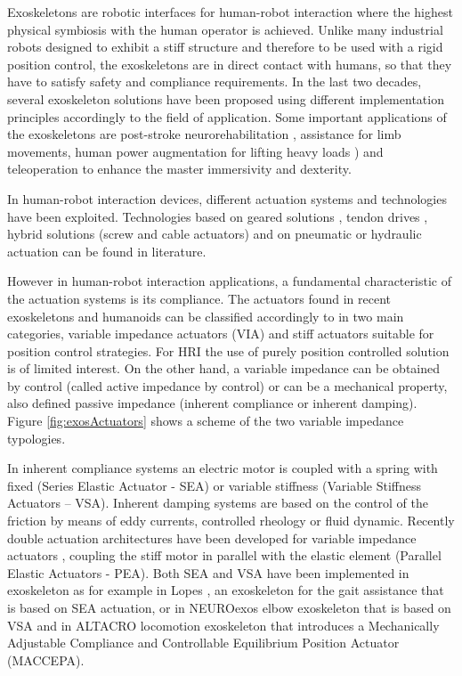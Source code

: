 \documentclass[journal]{IEEEtran}
\newcommand{\figref}[1]{Figure \ref{#1}}
\begin{document}
Exoskeletons are robotic interfaces for human-robot interaction where the highest physical symbiosis with the human operator is achieved.
Unlike many industrial robots  designed to exhibit a stiff structure and therefore to be used with a rigid position control, the exoskeletons are in direct contact with humans, so that  they have to satisfy  safety and compliance requirements.
In the last two decades, several exoskeleton solutions have been proposed using different implementation principles accordingly to the field of application.
Some important applications of the exoskeletons are post-stroke neurorehabilitation \cite{lo2012exoskeleton,pirondini2016evaluation}, assistance for limb movements, human power augmentation for lifting  heavy loads \cite{kim2016powered}) and teleoperation \cite{buongiorno2018wres, rebelo2014bilateral} to enhance the master immersivity and dexterity.
%
\par In human-robot interaction devices, different actuation systems and technologies have been exploited.
Technologies based on geared solutions \cite{mihelj2007armin,vertechy2009development,carignan2005design}, tendon drives \cite{frisoli2009force,perry2007upper}, hybrid solutions (screw and cable actuators) \cite{garrec2008able} and  on pneumatic or hydraulic  actuation \cite{tsagarakis2003development,klein2010optimization} can be found in literature.
\par However in human-robot interaction applications, a fundamental characteristic of the actuation systems is its compliance. The actuators found in recent exoskeletons and humanoids can be classified accordingly to \cite{vanderborght2013variable} in two main categories, variable impedance actuators (VIA) and stiff actuators suitable for position control strategies. For HRI the use of purely position controlled solution is of limited interest. On the other hand, a variable impedance can be obtained by control (called active impedance by control) or can be a mechanical property, also defined passive impedance (inherent compliance or inherent damping). \figref{fig:exosActuators} shows a scheme of the two variable impedance typologies.
%
\par In inherent compliance systems an electric motor is coupled with a spring with fixed (Series Elastic Actuator - SEA) or variable stiffness (Variable Stiffness Actuators – VSA). Inherent damping systems are based on the control of the friction by means of eddy currents, controlled rheology or fluid dynamic. Recently double actuation architectures have been developed for variable impedance actuators	\cite{tagliamonte2012double}, coupling the stiff motor in parallel with the elastic element (Parallel Elastic Actuators - PEA).  Both SEA and VSA have been implemented in exoskeleton as for example in Lopes \cite{veneman2007design}, an exoskeleton for the gait assistance that is based on SEA actuation, or in NEUROexos elbow exoskeleton \cite{vitiello2013neuroexos} that is based on VSA and in ALTACRO locomotion exoskeleton \cite{cherelle2010maccepa} that introduces a Mechanically Adjustable Compliance and Controllable Equilibrium Position Actuator (MACCEPA).
\end{document}
